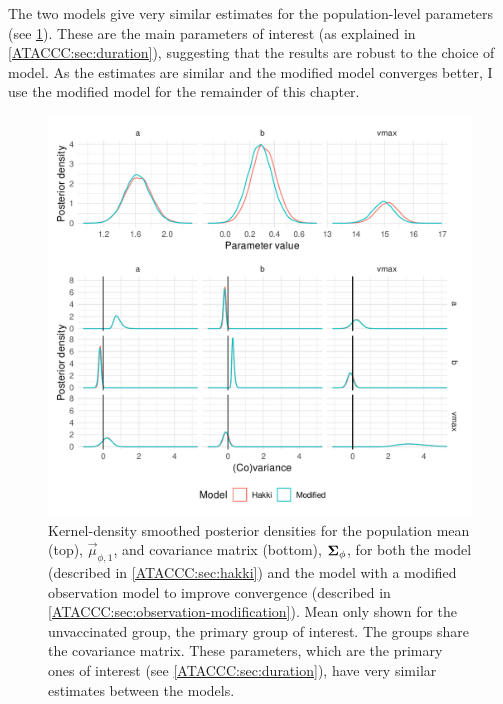 \documentclass[thesis.tex]{subfiles}
\begin{document}
The two models give very similar estimates for the population-level parameters (see \cref{ATACCC:fig:compare-hakki-modified}).
These are the main parameters of interest (as explained in \cref{ATACCC:sec:duration}), suggesting that the results are robust to the choice of model.
As the estimates are similar and the modified model converges better, I use the modified model for the remainder of this chapter.
\begin{figure}
  \centering \includegraphics{ATACCC/compare_hakki_modified}
  \caption[Comparison of population-level parameters between models.]{Kernel-density smoothed posterior densities for the population mean (top), $\vec{\mu}_{\phi,1}$, and covariance matrix (bottom), $\bm{\Sigma}_\phi$, for both the \textcite{hakkiOnset} model (described in \cref{ATACCC:sec:hakki}) and the model with a modified observation model to improve convergence (described in \cref{ATACCC:sec:observation-modification}). Mean only shown for the unvaccinated group, the primary group of interest. The groups share the covariance matrix. These parameters, which are the primary ones of interest (see \cref{ATACCC:sec:duration}), have very similar estimates between the models. \label{ATACCC:fig:compare-hakki-modified}}
\end{figure}
\end{document}
